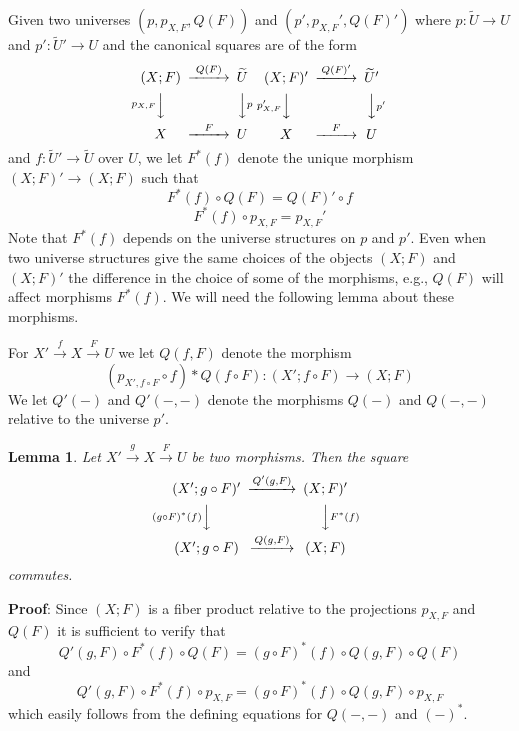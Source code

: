\documentclass[12pt]{article}
\newenvironment{eq}{\begin{equation}}{\end{equation}}
\newenvironment{myproof}{{\bf Proof}:}{\vskip 5mm }
\newtheorem{lemma}[proposition]{Lemma}
\newcommand{\llabel}[1]{\label{#1}}
\newcommand{\sr}{\rightarrow}
\newcommand{\wt}{\widetilde}
\newcommand{\spc}{{\,\,\,\,\,\,\,}}
\begin{document}
Given two universes $(p,p_{X,F},Q(F))$ and $(p',p_{X,F}',Q(F)')$ where $p:\wt{U}\sr U$ and $p':\wt{U}'\sr U$ and the canonical squares are of the form
%
$$
\begin{CD}
(X;F) @>Q(F)>> \wt{U}\\
@Vp_{X,F} VV @VVp V\\
X @>F>> U
\end{CD}
\spc
\begin{CD}
(X;F)' @>Q(F)'>> \wt{U}'\\
@Vp_{X,F}' VV @VVp' V\\
X @>F>> U
\end{CD}
$$
%
and $f:\wt{U}'\sr \wt{U}$ over $U$, we let $F^*(f)$ denote the unique morphism $(X;F)'\sr (X;F)$ such that 
%
\begin{eq}\llabel{2015.04.08.eq3}
F^*(f)\circ Q(F)=Q(F)'\circ f
\end{eq}
%
\begin{eq}\llabel{2015.04.08.eq4}
F^*(f)\circ p_{X,F}=p_{X,F}'
\end{eq}
%
Note that $F^*(f)$ depends on the universe structures on $p$ and $p'$. Even when two universe structures give the same choices of the objects $(X;F)$ and $(X;F)'$ the difference in the choice of some of the morphisms, e.g., $Q(F)$ will affect morphisms $F^*(f)$. We will need the following lemma about these morphisms. 

For $X'\stackrel{f}{\sr}X \stackrel{F}{\sr}U$ we let $Q(f,F)$ denote the morphism
%
$$(p_{X',f\circ F}\circ f)*Q(f\circ F):(X';f\circ F)\sr (X;F)$$
%
We let $Q'(-)$ and $Q'(-,-)$ denote the morphisms $Q(-)$ and $Q(-,-)$ relative to the universe $p'$.
%
\begin{lemma}
\llabel{2015.04.20.l1}
Let $X'\stackrel{g}{\sr}X\stackrel{F}{\sr}U$ be two morphisms. Then the square
%
$$
\begin{CD}
(X';g\circ F)' @>Q'(g,F)>> (X;F)'\\
@V(g\circ F)^*(f)VV @VVF^*(f) V\\
(X';g\circ F) @>Q(g,F)>> (X;F)
\end{CD}
$$
%
commutes.
%
\end{lemma}
%
\begin{myproof}
Since $(X;F)$ is a fiber product relative to the projections $p_{X,F}$ and $Q(F)$ it is sufficient to verify that
%
$$Q'(g,F)\circ F^*(f)\circ Q(F)=(g\circ F)^*(f) \circ Q(g,F)\circ Q(F)$$
%
and
%
$$Q'(g,F)\circ F^*(f)\circ p_{X,F}=(g\circ F)^*(f) \circ Q(g,F)\circ p_{X,F}$$
%
which easily follows from the defining equations for $Q(-,-)$ and $(-)^*$.
\end{myproof}
\end{document}

